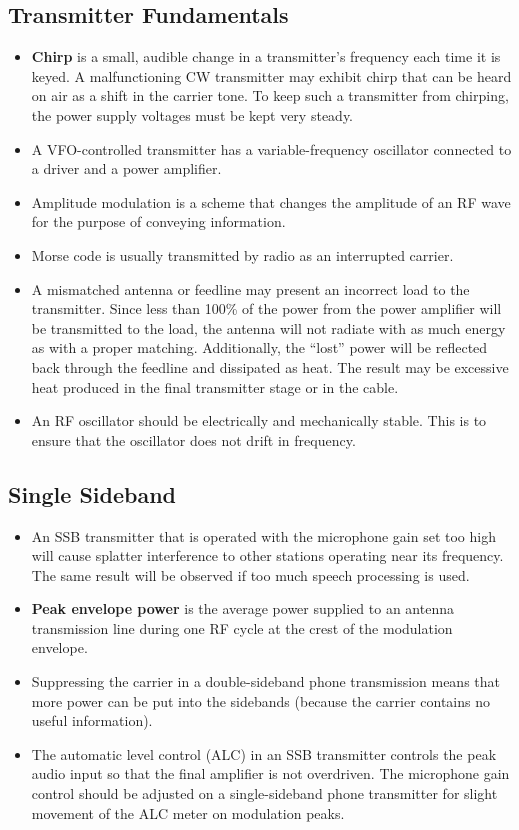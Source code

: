 \documentclass[letterpaper,12pt]{scrartcl}
\begin{document}
\subsection{Transmitter Fundamentals}

\begin{itemize}
\item \textbf{Chirp} is a small, audible change in a transmitter's frequency each time it is keyed. A malfunctioning CW transmitter may exhibit chirp that can be heard on air
as a shift in the carrier tone. To keep such a transmitter from chirping, the power supply voltages must be kept very steady.
\item A VFO-controlled transmitter has a variable-frequency oscillator connected to a driver and a power amplifier.
\item Amplitude modulation is a scheme that changes the amplitude of an RF wave for the purpose of conveying information.
\item Morse code is usually transmitted by radio as an interrupted carrier.
\item A mismatched antenna or feedline may present an incorrect load to the transmitter. 
Since less than 100\% of the power from the power amplifier will be transmitted to the load, the antenna will not radiate with as much energy
as with a proper matching. Additionally, the ``lost'' power will be reflected back through the feedline and dissipated as heat.
The result may be excessive heat produced in the final transmitter stage or in the cable.
\item An RF oscillator should be electrically and mechanically stable. This is to ensure that the oscillator does not drift in frequency.
\end{itemize}

\subsection{Single Sideband}

\begin{itemize} 
\item An SSB transmitter that is operated with the microphone gain set too high will cause splatter interference to other stations operating near its frequency.
The same result will be observed if too much speech processing is used.
\item \textbf{Peak envelope power} is the average power supplied to an antenna transmission line during one RF cycle at the crest of the modulation envelope.
\item Suppressing the carrier in a double-sideband phone transmission means that more power can be put into the sidebands
(because the carrier contains no useful information).
\item The automatic level control (ALC) in an SSB transmitter controls the peak
audio input so that the final amplifier is not overdriven.
The microphone gain control should be adjusted on a single-sideband phone transmitter for slight movement of the ALC meter on modulation peaks.
\end{itemize}
\end{document}
